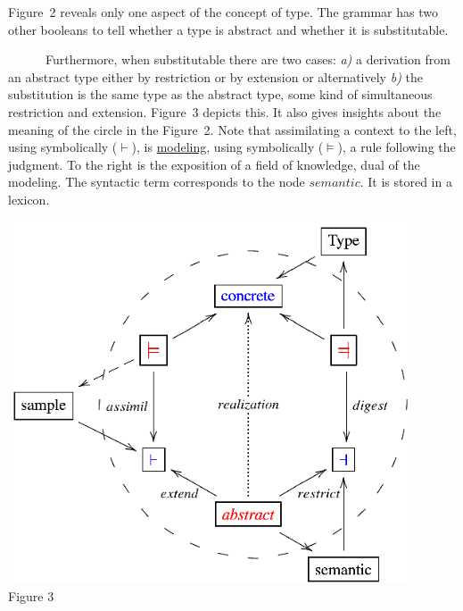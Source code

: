 Figure~2 reveals only one aspect of the concept of type. The grammar has two other booleans to tell whether a type is abstract and whether it is substitutable.\\ 
\noindent
\begin{minipage}[h]{7.0cm}
\indent
~~~~~~Furthermore, when substitutable there are two cases: {\it a)} a derivation from an abstract type either by restriction or by extension or alternatively {\it b)} the substitution is the same type as the abstract type, some kind of simultaneous restriction and extension. Figure~3 depicts this. It also gives insights about the meaning of the circle in the Figure~2. Note that assimilating a context to the left, using symbolically ($\vdash$), is \underline{modeling}, using symbolically ($\models$), a rule following the judgment. To the right is the exposition of a field of knowledge, dual of the modeling. The syntactic term corresponds to the node $semantic$. It is stored in a lexicon.

\end{minipage}
\begin{minipage}[h]{7.0cm}
 \begin{center}

  \includegraphics[width=0.9\textwidth]{part8/Viallefond_P52/P52_3.eps}
\\ Figure 3

 \end{center}
\end{minipage}
\hfill

